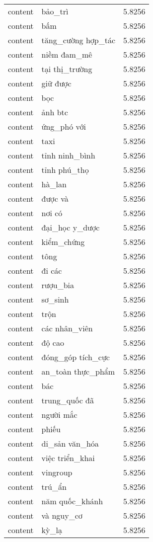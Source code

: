 \documentclass{article}
\begin{document}
\begin{tabular}{lll}
content & bảo\_trì & 5.8256\\
content & bấm & 5.8256\\
content & tăng\_cường hợp\_tác & 5.8256\\
content & niềm đam\_mê & 5.8256\\
content & tại thị\_trường & 5.8256\\
content & giữ được & 5.8256\\
content & bọc & 5.8256\\
content & ảnh btc & 5.8256\\
content & ứng\_phó với & 5.8256\\
content & taxi & 5.8256\\
content & tỉnh ninh\_bình & 5.8256\\
content & tỉnh phú\_thọ & 5.8256\\
content & hà\_lan & 5.8256\\
content & được và & 5.8256\\
content & nơi có & 5.8256\\
content & đại\_học y\_dược & 5.8256\\
content & kiểm\_chứng & 5.8256\\
content & tông & 5.8256\\
content & đi các & 5.8256\\
content & rượu\_bia & 5.8256\\
content & sơ\_sinh & 5.8256\\
content & trộn & 5.8256\\
content & các nhân\_viên & 5.8256\\
content & độ cao & 5.8256\\
content & đóng\_góp tích\_cực & 5.8256\\
content & an\_toàn thực\_phẩm & 5.8256\\
content & bác & 5.8256\\
content & trung\_quốc đã & 5.8256\\
content & người mắc & 5.8256\\
content & phiếu & 5.8256\\
content & di\_sản văn\_hóa & 5.8256\\
content & việc triển\_khai & 5.8256\\
content & vingroup & 5.8256\\
content & trú\_ẩn & 5.8256\\
content & năm quốc\_khánh & 5.8256\\
content & và nguy\_cơ & 5.8256\\
content & kỳ\_lạ & 5.8256\\

\end{tabular}
\end{document}
